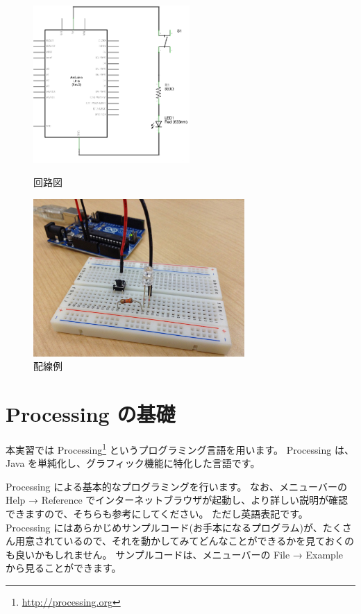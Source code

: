 \documentclass[11pt,a4paper]{jarticle}
\begin{document}
\begin{figure}[h!]
 \begin{minipage}{0.5\columnwidth}
  \centering
  \includegraphics[height=60mm]{circuit01.eps}
  \caption{回路図}
  \label{circuit}
 \end{minipage}
 \begin{minipage}{0.5\columnwidth}
  \centering
  \includegraphics[height=60mm]{sample_circuit.eps}
  \caption{配線例}
 \end{minipage}
\end{figure}

\section{Processing の基礎}
本実習では Processing\footnote{\url{http://processing.org}} というプログラミング言語を用います。
Processing は、Java を単純化し、グラフィック機能に特化した言語です。

Processing による基本的なプログラミングを行います。
なお、メニューバーの Help → Reference でインターネットブラウザが起動し、より詳しい説明が確認できますので、そちらも参考にしてください。
ただし英語表記です。
Processing にはあらかじめサンプルコード(お手本になるプログラム)が、たくさん用意されているので、それを動かしてみてどんなことができるかを見ておくのも良いかもしれません。
サンプルコードは、メニューバーの File → Example から見ることができます。
\end{document}
